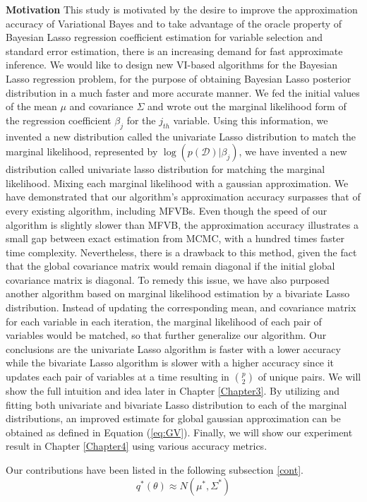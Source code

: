 \textbf{Motivation}
This study is motivated by the desire to improve the approximation accuracy of Variational Bayes and to take advantage of the oracle property of Bayesian Lasso regression coefficient estimation for variable selection and standard error estimation, there is an increasing demand for fast approximate inference. We would like to design new VI-based algorithms for the Bayesian Lasso regression problem, for the purpose of obtaining Bayesian Lasso posterior distribution in a much faster and more accurate manner.
We fed the initial values of the mean $\mu$ and covariance $\Sigma$ and wrote out the marginal likelihood form of the regression coefficient $\beta_j$ for the $j_{th}$ variable. Using this information, we invented a new distribution called the univariate Lasso distribution to match the marginal likelihood, represented by $\log(p(\mathcal{D})|\beta_j)$, we have invented a new distribution called univariate lasso distribution for matching the marginal likelihood. Mixing each marginal likelihood with a gaussian approximation. We have demonstrated that our algorithm's approximation accuracy surpasses that of every existing algorithm, including MFVBs. Even though the speed of our algorithm is slightly slower than MFVB, the approximation accuracy illustrates a small gap between exact estimation from MCMC, with a hundred times faster time complexity. Nevertheless, there is a drawback to this method, given the fact that the global covariance matrix would remain diagonal if the initial global covariance matrix is diagonal.
To remedy this issue, we have also purposed another algorithm based on marginal likelihood estimation by a bivariate Lasso distribution. Instead of updating the corresponding mean, and covariance matrix for each variable in each iteration, the marginal likelihood of each pair of variables would be matched, so that further generalize our algorithm. Our conclusions are the univariate Lasso algorithm is faster with a lower accuracy while the bivariate Lasso algorithm is slower with a higher accuracy since it updates each pair of variables at a time resulting in ${p\choose 2}$ of unique pairs. We will show the full intuition and idea later in Chapter \ref{Chapter3}.
By utilizing and fitting both univariate and bivariate Lasso distribution to each of the marginal distributions, an improved estimate for global gaussian approximation can be obtained as defined in Equation (\ref{eq:GV}). Finally, we will show our experiment result in Chapter \ref{Chapter4} using various accuracy metrics.

Our contributions have been listed in the following subsection \ref{cont}.
\begin{equation}
	\label{eq:GV}
	q^{*}(\theta) \approx N(\mu^*,\Sigma^*)
\end{equation}

